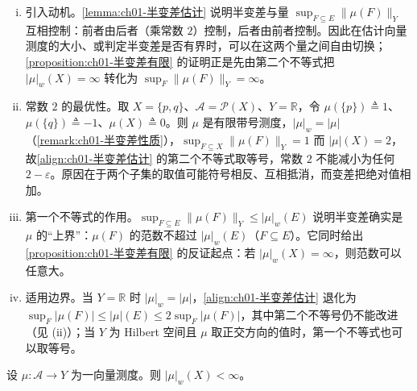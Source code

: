 \documentclass[../../main.tex]{subfiles}%
\begin{document}
\begin{remark}\label{remark:ch01-半变差估计注}
\begin{enumerate}[(i)]
\item 引入动机。\cref{lemma:ch01-半变差估计} 说明半变差与量 $\sup_{F\subseteq E}\|\mu(F)\|_Y$ 互相控制：前者由后者（乘常数 $2$）控制，后者由前者控制。因此在估计向量测度的大小、或判定半变差是否有界时，可以在这两个量之间自由切换；\cref{proposition:ch01-半变差有限} 的证明正是先由第二个不等式把 $|\mu|_w(X)=\infty$ 转化为 $\sup_{F}\|\mu(F)\|_Y=\infty$。
\item 常数 $2$ 的最优性。取 $X=\{p,q\}$、$\mathcal{A}=\mathcal{P}(X)$、$Y=\mathbb{R}$，令 $\mu(\{p\})\triangleq1$、$\mu(\{q\})\triangleq-1$、$\mu(X)\triangleq0$。则 $\mu$ 是有限带号测度，$|\mu|_w=|\mu|$（\cref{remark:ch01-半变差性质}），$\sup_{F\subseteq X}\|\mu(F)\|_Y=1$ 而 $|\mu|(X)=2$，故\eqref{align:ch01-半变差估计} 的第二个不等式取等号，常数 $2$ 不能减小为任何 $2-\varepsilon$。原因在于两个子集的取值可能符号相反、互相抵消，而变差把绝对值相加。
\item 第一个不等式的作用。$\sup_{F\subseteq E}\|\mu(F)\|_Y\leqslant|\mu|_w(E)$ 说明半变差确实是 $\mu$ 的“上界”：$\mu(F)$ 的范数不超过 $|\mu|_w(E)$（$F\subseteq E$）。它同时给出\cref{proposition:ch01-半变差有限} 的反证起点：若 $|\mu|_w(X)=\infty$，则范数可以任意大。
\item 适用边界。当 $Y=\mathbb{R}$ 时 $|\mu|_w=|\mu|$，\eqref{align:ch01-半变差估计} 退化为 $\sup_F|\mu(F)|\leqslant|\mu|(E)\leqslant 2\sup_F|\mu(F)|$，其中第二个不等号仍不能改进（见 (ii)）；当 $Y$ 为 Hilbert 空间且 $\mu$ 取正交方向的值时，第一个不等式也可以取等号。
\end{enumerate}
\end{remark}

\begin{proposition}\label{proposition:ch01-半变差有限}
设 $\mu:\mathcal{A}\to Y$ 为一向量测度。则 $|\mu|_w(X)<\infty$。
\end{proposition}
\end{document}
